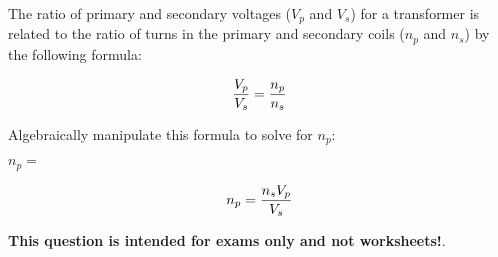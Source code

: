 

The ratio of primary and secondary voltages ($V_p$ and $V_s$) for a transformer is related to the ratio of turns in the primary and secondary coils ($n_p$ and $n_s$) by the following formula:

$${V_p \over V_s} = {n_p \over n_s}$$

Algebraically manipulate this formula to solve for $n_p$:

\vskip 20pt

$n_p = $







$$n_p = {{n_s V_p} \over V_s}$$







{\bf This question is intended for exams only and not worksheets!}.



